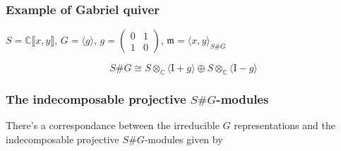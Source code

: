 \documentclass[screen, aspectratio=43]{beamer}
\theoremstyle{definition}
\newcommand{\C}{\mathbb{C}}
\begin{document}
\begin{frame}[fragile]
	\frametitle{Example of Gabriel quiver}
	\begin{example}
		\begin{center}
		$S = \C\llbracket x, y \rrbracket$, $G= \langle g \rangle$, $g = \begin{pmatrix}
		0 & 1\\
		1 & 0
		\end{pmatrix}$, $\mathfrak{m} = \langle x, y \rangle_{S\#G}$
		\end{center}
		$$ S\#G \cong S \otimes_\C \langle \mathrm{I} + g \rangle \oplus S \otimes_\C \langle \mathrm{I} - g \rangle $$
		\begin{center}
		\end{center}
	\end{example}
\end{frame}

\begin{frame}[fragile]
	\frametitle{The indecomposable projective $S\#G$-modules}
	\begin{theorem}
		There's a correspondance between the irreducible $G$ representations and the indecomposable projective $S\#G$-modules given by
		\begin{center}
		\end{center}
	\end{theorem}
\end{frame}
\end{document}
